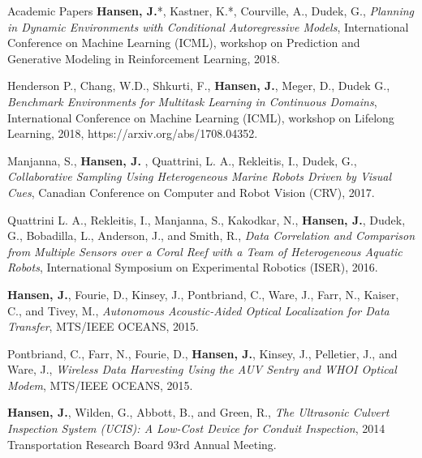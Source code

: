 \documentclass{resume} %
\begin{document}
\begin{rSection}{Academic Papers}
\textbf{Hansen, J.}*, Kastner, K.*, Courville, A., Dudek, G.,  \textit{Planning in Dynamic Environments with Conditional Autoregressive Models}, International Conference on Machine Learning (ICML), workshop on Prediction and Generative Modeling in Reinforcement Learning, 2018.

Henderson P., Chang, W.D., Shkurti, F., \textbf{Hansen, J.}, Meger, D., Dudek G., 
\textit{Benchmark Environments for Multitask Learning in Continuous Domains}, International Conference on Machine Learning (ICML), workshop on Lifelong Learning, 2018, https://arxiv.org/abs/1708.04352. 

Manjanna, S., \textbf{ Hansen, J. }, Quattrini, L. A., Rekleitis, I., Dudek, G., 
\textit{Collaborative Sampling Using Heterogeneous Marine Robots Driven by Visual Cues}, Canadian Conference on Computer and Robot Vision (CRV), 2017. 
                
Quattrini L. A., Rekleitis, I., Manjanna, S., Kakodkar, N., \textbf{Hansen, J.},   Dudek, G.,  Bobadilla, L.,  Anderson, J., and Smith, R.,
            \textit{Data Correlation and Comparison from Multiple Sensors over a Coral Reef with a Team of Heterogeneous Aquatic Robots},
             International Symposium on Experimental Robotics (ISER),
              2016.

\textbf{Hansen, J.}, Fourie, D., Kinsey, J., Pontbriand, C., Ware, J., Farr, N., Kaiser, C., and Tivey, M., \textit{Autonomous Acoustic-Aided Optical Localization for Data Transfer}, MTS/IEEE OCEANS, 2015.

Pontbriand, C., Farr, N., Fourie, D., \textbf{Hansen, J.},  Kinsey, J., Pelletier, J., and Ware, J., 
 \textit{Wireless Data Harvesting Using the AUV Sentry and WHOI Optical Modem}, MTS/IEEE OCEANS, 2015.

\textbf{Hansen, J.}, Wilden, G., Abbott, B., and Green, R., \textit{The Ultrasonic Culvert
Inspection System (UCIS): A Low-Cost Device for Conduit Inspection}, 2014 Transportation
Research Board 93rd Annual Meeting. 
\end{rSection}
\vspace{-.2cm}
\end{document}

